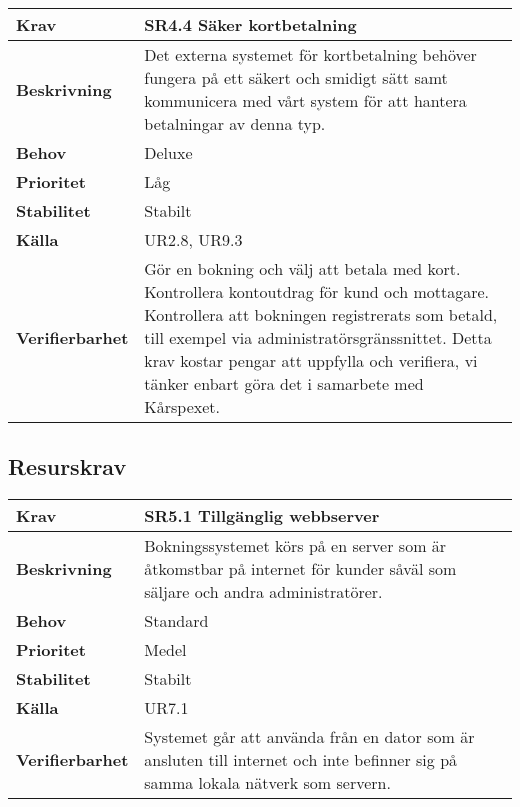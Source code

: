 \documentclass[a4paper, twoside, 11pt, titlepage]{article}
\begin{document}
	\begin {table} [ht] \begin{tabular} { p{2.6cm} p{12.5cm} }
		\hline
		\sffamily\textbf{Krav} & \sffamily\textbf{SR4.4 Säker kortbetalning } \\
		\hline
		\sffamily\textbf{Beskrivning} & Det externa systemet för kortbetalning behöver fungera på ett säkert och smidigt sätt samt kommunicera med vårt system för att hantera betalningar av denna typ.  \\
		\hline
		\sffamily\textbf{Behov} & Deluxe  \\
		\hline
		\sffamily\textbf{Prioritet} & Låg  \\
		\hline
		\sffamily\textbf{Stabilitet} & Stabilt  \\
		\hline
		\sffamily\textbf{Källa} & UR2.8, UR9.3  \\
		\hline
		\sffamily\textbf{Verifierbarhet} & Gör en bokning och välj att betala med kort. Kontrollera kontoutdrag för kund och mottagare. Kontrollera att bokningen registrerats som betald, till exempel via administratörsgränssnittet. Detta krav kostar pengar att uppfylla och verifiera, vi tänker enbart göra det i samarbete med Kårspexet.  \\
		\hline
	\end{tabular} \end{table} \FloatBarrier


	\subsection{Resurskrav}


	\begin {table} [ht] \begin{tabular} { p{2.6cm} p{12.5cm} }
		\hline
		\sffamily\textbf{Krav} & \sffamily\textbf{SR5.1 Tillgänglig webbserver } \\
		\hline
		\sffamily\textbf{Beskrivning} & Bokningssystemet körs på en server som är åtkomstbar på internet för kunder såväl som säljare och andra administratörer.  \\
		\hline
		\sffamily\textbf{Behov} & Standard  \\
		\hline
		\sffamily\textbf{Prioritet} & Medel  \\
		\hline
		\sffamily\textbf{Stabilitet} & Stabilt  \\
		\hline
		\sffamily\textbf{Källa} & UR7.1  \\
		\hline
		\sffamily\textbf{Verifierbarhet} & Systemet går att använda från en dator som är ansluten till internet och inte befinner sig på samma lokala nätverk som servern.  \\
		\hline
	\end{tabular} \end{table} \FloatBarrier
	\vspace{6mm}
\end{document}
